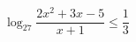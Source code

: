 \begin{ex}[type=inequality]
	\begin{condition}
	\( \log_{27}\dfrac{2x^2+3x-5}{x+1}\le\dfrac{1}{3} \)
	\end{condition}
	\answer{\( (-2,5;-2]\cup(1;2] \)}
\end{ex}